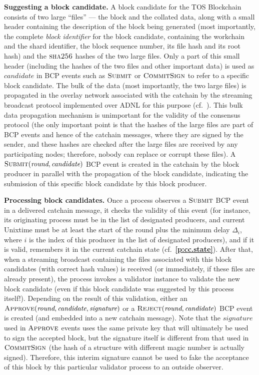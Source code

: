 \documentclass[12pt,oneside]{article}
\def\makepoint#1{\medbreak\noindent{\bf #1.\ }}
\def\nxsubpoint{\refstepcounter{subsubsection}%
  \smallbreak\makepoint{\thesubsubsection}}
\def\refpoint#1{{\rm\textbf{\ref{#1}}}}
\let\ptref=\refpoint
\def\emb#1{\textbf{#1.}}
\let\vr=\textit
\def\opsc#1{\operatorname{\textsc{#1}}}
\def\Sha{\opsc{sha256}}
\def\Submit{\opsc{Submit}}
\def\Approve{\opsc{Approve}}
\def\Reject{\opsc{Reject}}
\def\CommitSign{\opsc{CommitSign}}
\def\wround{\vr{round}}
\def\wcandidate{\vr{candidate}}
\def\wsignature{\vr{signature}}
\begin{document}
\nxsubpoint\emb{Suggesting a block candidate}
A block candidate for the TOS Block\-chain consists of two large ``files'' --- the block and the collated data, along with a small header containing the description of the block being generated (most importantly, the complete {\em block identifier\/} for the block candidate, containing the workchain and the shard identifier, the block sequence number, its file hash and its root hash) and the $\Sha$ hashes of the two large files. Only a part of this small header (including the hashes of the two files and other important data) is used as $\wcandidate$ in BCP events such as $\Submit$ or $\CommitSign$ to refer to a specific block candidate. The bulk of the data (most importantly, the two large files) is propagated in the overlay network associated with the catchain by the streaming broadcast protocol implemented over ADNL for this purpose (cf.~\cite[5]{TOS}). This bulk data propagation mechanism is unimportant for the validity of the consensus protocol (the only important point is that the hashes of the large files are part of BCP events and hence of the catchain messages, where they are signed by the sender, and these hashes are checked after the large files are received by any participating nodes; therefore, nobody can replace or corrupt these files). A $\Submit(\wround,\wcandidate)$ BCP event is created in the catchain by the block producer in parallel with the propagation of the block candidate, indicating the submission of this specific block candidate by this block producer.

\nxsubpoint\emb{Processing block candidates}
Once a process observes a $\Submit$ BCP event in a delivered catchain message, it checks the validity of this event (for instance, its originating process must be in the list of designated producers, and current Unixtime must be at least the start of the round plus the minimum delay $\Delta_i$, where $i$ is the index of this producer in the list of designated producers), and if it is valid, remembers it in the current catchain state (cf.~\ptref{p:cc.state}). After that, when a streaming broadcast containing the files associated with this block candidates (with correct hash values) is received (or immediately, if these files are already present), the process invokes a validator instance to validate the new block candidate (even if this block candidate was suggested by this process itself!). Depending on the result of this validation, either an $\Approve(\wround,\wcandidate,\wsignature)$ or a $\Reject(\wround,\wcandidate)$ BCP event is created (and embedded into a new catchain message). Note that the $\wsignature$ used in $\Approve$ events uses the same private key that will ultimately be used to sign the accepted block, but the signature itself is different from that used in $\CommitSign$ (the hash of a structure with different magic number is actually signed). Therefore, this interim signature cannot be used to fake the acceptance of this block by this particular validator process to an outside observer.
\end{document}
